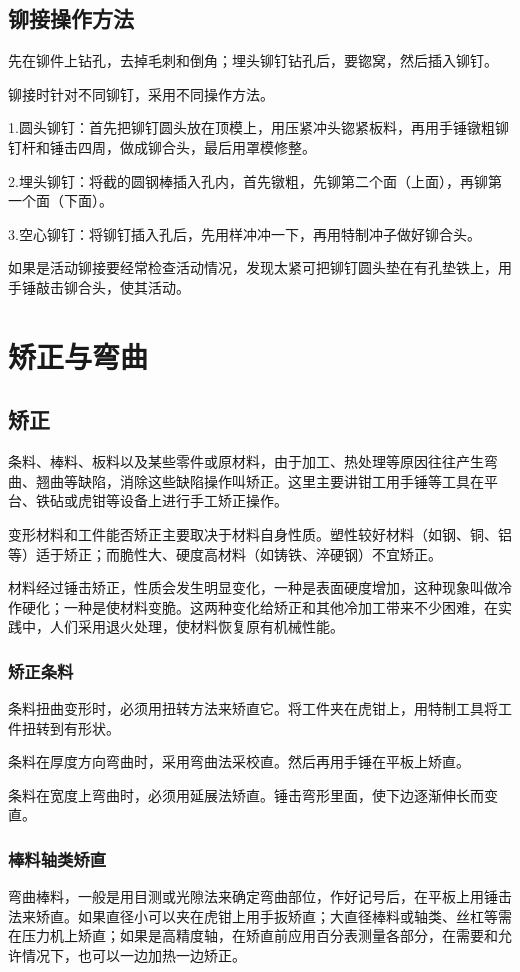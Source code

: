 \documentclass{ctexbook}
\begin{document}
\subsection{铆接操作方法}
先在铆件上钻孔，去掉毛刺和倒角；埋头铆钉钻孔后，要锪窝，然后插入铆钉。

铆接时针对不同铆钉，采用不同操作方法。

1.圆头铆钉：首先把铆钉圆头放在顶模上，用压紧冲头锪紧板料，再用手锤镦粗铆钉杆和锤击四周，做成铆合头，最后用罩模修整。

2.埋头铆钉：将截的圆钢棒插入孔内，首先镦粗，先铆第二个面（上面），再铆第一个面（下面）。

3.空心铆钉：将铆钉插入孔后，先用样冲冲一下，再用特制冲子做好铆合头。

如果是活动铆接要经常检查活动情况，发现太紧可把铆钉圆头垫在有孔垫铁上，用手锤敲击铆合头，使其活动。
\section{矫正与弯曲}
\subsection{矫正}
条料、棒料、板料以及某些零件或原材料，由于加工、热处理等原因往往产生弯曲、翘曲等缺陷，消除这些缺陷操作叫矫正。这里主要讲钳工用手锤等工具在平台、铁砧或虎钳等设备上进行手工矫正操作。

变形材料和工件能否矫正主要取决于材料自身性质。塑性较好材料（如钢、铜、铝等）适于矫正；而脆性大、硬度高材料（如铸铁、淬硬钢）不宜矫正。

材料经过锤击矫正，性质会发生明显变化，一种是表面硬度增加，这种现象叫做冷作硬化；一种是使材料变脆。这两种变化给矫正和其他冷加工带来不少困难，在实践中，人们采用退火处理，使材料恢复原有机械性能。
\subsubsection{矫正条料}
条料扭曲变形时，必须用扭转方法来矫直它。将工件夹在虎钳上，用特制工具将工件扭转到有形状。

条料在厚度方向弯曲时，采用弯曲法采校直。然后再用手锤在平板上矫直。
	
条料在宽度上弯曲时，必须用延展法矫直。锤击弯形里面，使下边逐渐伸长而变直。
\subsubsection{棒料轴类矫直}
弯曲棒料，一般是用目测或光隙法来确定弯曲部位，作好记号后，在平板上用锤击法来矫直。如果直径小可以夹在虎钳上用手扳矫直；大直径棒料或轴类、丝杠等需在压力机上矫直；如果是高精度轴，在矫直前应用百分表测量各部分，在需要和允许情况下，也可以一边加热一边矫正。
\end{document}
